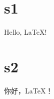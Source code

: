 \documentclass[UTF8]{ctexart}
\begin{document}
    \section{s1}
        Hello, \LaTeX !
    \section{s2}
        你好，\LaTeX！
\end{document}
